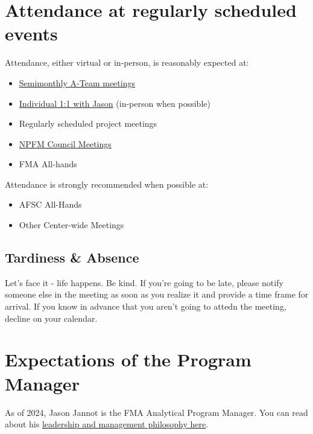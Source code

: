 \documentclass[
  letterpaper,
  DIV=11,
  numbers=noendperiod]{scrreprt}
\providecommand{\tightlist}{%
  \setlength{\itemsep}{0pt}\setlength{\parskip}{0pt}}\usepackage{longtable,booktabs,array}
\begin{document}
\section{Attendance at regularly scheduled
events}\label{attendance-at-regularly-scheduled-events}

Attendance, either virtual or in-person, is reasonably expected at:

\begin{itemize}
\tightlist
\item
  \hyperref[ateam-meetings]{Semimonthly A-Team meetings}
\item
  \hyperref[intro.qmdux5cux23meet-with-Jason]{Individual 1:1 with Jason}
  (in-person when possible)\\
\item
  Regularly scheduled project meetings\\
\item
  \href{https://www.npfmc.org/current-or-next-council-meeting/}{NPFM
  Council Meetings}\\
\item
  FMA All-hands
\end{itemize}

Attendance is strongly recommended when possible at:

\begin{itemize}
\tightlist
\item
  AFSC All-Hands\\
\item
  Other Center-wide Meetings
\end{itemize}

\subsection{Tardiness \& Absence}\label{tardiness-absence}

Let's face it - life happens. Be kind. If you're going to be late,
please notify someone else in the meeting as soon as you realize it and
provide a time frame for arrival. If you know in advance that you aren't
going to attedn the meeting, decline on your calendar.

\section{Expectations of the Program
Manager}\label{expectations-of-the-program-manager}

As of 2024, Jason Jannot is the FMA Analytical Program Manager. You can
read about his \hyperref[sec-jj-philosophy]{leadership and management
philosophy here}.
\end{document}
